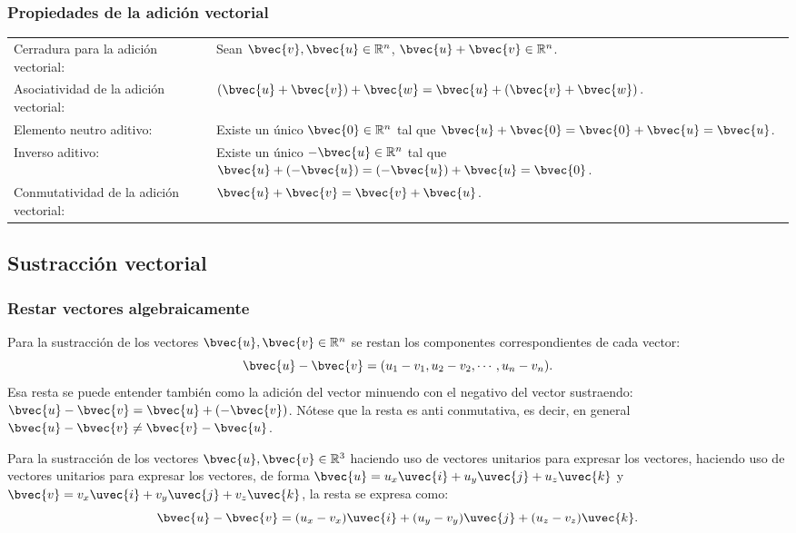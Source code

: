 \documentclass{fmbnotes}
\begin{document}
\subsubsection{Propiedades de la adición vectorial}

\begin{tabular}{lp{}}
	\rule[1ex]{0pt}{2.5ex} Cerradura para la adición vectorial: & Sean \(\bvec{v},\bvec{u} \in \mathbb{R}^{n}\), \(\bvec{u}+\bvec{v} \in \mathbb{R}^{n}\).\\
	\rule[1ex]{0pt}{2.5ex} Asociatividad de la adición vectorial: & \((\bvec{u}+\bvec{v})+\bvec{w}=\bvec{u}+(\bvec{v}+\bvec{w})\).\\
	\rule[1ex]{0pt}{2.5ex} Elemento neutro aditivo: &  Existe un único \(\bvec{0} \in \mathbb{R}^{n}\) tal que \(\bvec{u}+\bvec{0}=\bvec{0}+\bvec{u}=\bvec{u}\). \\
	\rule[1ex]{0pt}{2.5ex} Inverso aditivo: &  Existe un único \(-\bvec{u} \in \mathbb{R}^{n}\) tal que \(\bvec{u}+(-\bvec{u})=(-\bvec{u})+\bvec{u}=\bvec{0}\). \\
	\rule[1ex]{0pt}{2.5ex} Conmutatividad de la adición vectorial: & \(\bvec{u}+\bvec{v}=\bvec{v}+\bvec{u}\).\\
\end{tabular}

\subsection{Sustracción vectorial}
\subsubsection{Restar vectores algebraicamente}

Para la sustracción de los vectores \( \bvec{u}, \bvec{v} \in \mathbb{R}^{n} \) se restan los componentes correspondientes de cada vector:
\[ \bvec{u} - \bvec{v} = (u_1 - v_1, u_2 - v_2, \cdots , u_n - v_n).\]
Esa resta se puede entender también como la adición del vector minuendo con el negativo del vector sustraendo:
\( \bvec{u} - \bvec{v} = \bvec{u} + (-\bvec{v})\). Nótese que la resta es anti conmutativa, es decir, en general \(\bvec{u} - \bvec{v} \neq \bvec{v} - \bvec{u}\).

Para la sustracción de los vectores \( \bvec{u}, \bvec{v} \in \mathbb{R}^{3} \) haciendo uso de vectores unitarios para expresar los vectores, haciendo uso de vectores unitarios para expresar los vectores, de forma \(\bvec{u} = u_x\uvec{i}+u_y\uvec{j}+u_z\uvec{k}\) y \(\bvec{v} = v_x\uvec{i}+v_y\uvec{j}+v_z\uvec{k}\), la resta se expresa como:
\[ \bvec{u} - \bvec{v} = (u_x - v_x)\uvec{i} + (u_y - v_y)\uvec{j} + (u_z - v_z)\uvec{k}.\]
\end{document}
